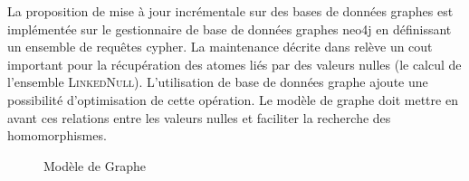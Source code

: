 La proposition de mise à jour incrémentale sur des bases de données graphes est implémentée sur le gestionnaire de base de données graphes \gls{neo4j} en définissant un ensemble de requêtes \gls{cypher}.
La maintenance décrite dans \cite{chabinConsistentUpdatingDatabases2020} relève un cout important pour la récupération des atomes liés par des valeurs nulles (le calcul de l'ensemble \textsc{LinkedNull}).
L'utilisation de base de données graphe ajoute une possibilité d'optimisation de cette opération.
Le modèle de graphe doit mettre en avant ces relations entre les valeurs nulles et faciliter la recherche des homomorphismes.

\begin{figure}[htb]
    \centering
    \begin{adjustbox}{width=.8\linewidth}
    \end{adjustbox}
    \caption{Modèle de Graphe}
    \label{fig:schema-graph}
\end{figure}

